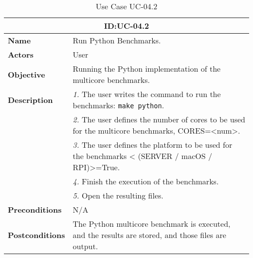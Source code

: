 \begin{table}[H]
    \centering
    \begin{tabular}{l p{10cm}}
        \toprule
        \multicolumn{2}{c}{\textbf{ID:\@ UC-04.2}} \\
        \toprule
        \textbf{Name}                         &  Run Python Benchmarks. \\
        \textbf{Actors}                       &  User \\
        \textbf{Objective}                    &  Running the Python implementation of the multicore benchmarks. \\
        \multirow{1}{*}{\textbf{Description}} & \textsl{1.} The user writes the command to run the benchmarks: \texttt{make python}.\\
                                              & \textsl{2.} The user defines the number of cores to be used for the multicore benchmarks, CORES=<num>.\\
                                              & \textsl{3.} The user defines the platform to be used for the benchmarks < (SERVER / macOS / RPI)>=True.\\
                                              & \textsl{4.} Finish the execution of the benchmarks.\\
                                              & \textsl{5.} Open the resulting files.\\
        \textbf{Preconditions}                &  N/A \\
        \textbf{Postconditions}               &  The Python multicore benchmark is executed, and the results are stored, and those files are output. \\
    \end{tabular}
    \caption{Use Case UC-04.2}\label{tab:uc-04.2}
\end{table}


